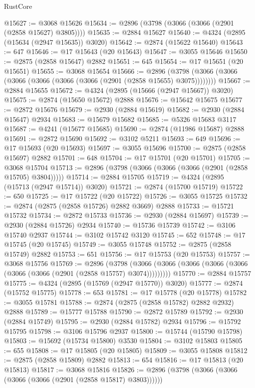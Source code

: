 \begin{lexlean}{RustCore}
\begin{coremodule}
@15627 := @3068 @15626
@15634 := @2896 (@3798 (@3066 (@3066 (@2901 (@2858 @15627) @3805))))
@15635 := @2884 @15627
@15640 := @4324 (@2895 (@15634 (@2947 @15635)) @3020)
@15642 := @2874 (@15622 @15640)
@15643 := 647
@15646 := @17 @15643 (@20 @15643)
@15647 := @3055 @15646
@15650 := @2875 (@2858 @15647) @2882
@15651 := 645
@15654 := @17 @15651 (@20 @15651)
@15655 := @3068 @15654
@15666 := @2896 (@3798 (@3066 (@3066 (@3066 (@3066 (@3066 (@3066 (@2901 (@2858 @15655) @3075))))))))
@15667 := @2884 @15655
@15672 := @4324 (@2895 (@15666 (@2947 @15667)) @3020)
@15675 := @2874 (@15650 @15672) @2888
@15676 := @15642 @15675
@15677 := @2872 @15676
@15679 := @2930 (@2884 @15619)
@15682 := @2930 (@2884 @15647) @2934
@15683 := @15679 @15682
@15685 := @5326 @15683 @3117
@15687 := @4241 (@15677 @15685)
@15690 := @2874 (@11986 @15687) @2888
@15691 := @2872 @15690
@15692 := @3102 @5211
@15693 := 649
@15696 := @17 @15693 (@20 @15693)
@15697 := @3055 @15696
@15700 := @2875 (@2858 @15697) @2882
@15701 := 648
@15704 := @17 @15701 (@20 @15701)
@15705 := @3068 @15704
@15713 := @2896 (@3798 (@3066 (@3066 (@3066 (@2901 (@2858 @15705) @3804)))))
@15714 := @2884 @15705
@15719 := @4324 (@2895 (@15713 (@2947 @15714)) @3020)
@15721 := @2874 (@15700 @15719)
@15722 := 650
@15725 := @17 @15722 (@20 @15722)
@15726 := @3055 @15725
@15732 := @2874 (@2875 (@2858 @15726) @2882 @3669) @2888
@15733 := @15721 @15732
@15734 := @2872 @15733
@15736 := @2930 (@2884 @15697)
@15739 := @2930 (@2884 @15726) @2934
@15740 := @15736 @15739
@15742 := @3106 @15740 @2937
@15744 := @3102 @15742 @3120
@15745 := 652
@15748 := @17 @15745 (@20 @15745)
@15749 := @3055 @15748
@15752 := @2875 (@2858 @15749) @2882
@15753 := 651
@15756 := @17 @15753 (@20 @15753)
@15757 := @3068 @15756
@15769 := @2896
    (@3798 (@3066 (@3066 (@3066 (@3066 (@3066 (@3066 (@3066 (@2901 (@2858 @15757) @3074)))))))))
@15770 := @2884 @15757
@15775 := @4324 (@2895 (@15769 (@2947 @15770)) @3020)
@15777 := @2874 (@15752 @15775)
@15778 := 653
@15781 := @17 @15778 (@20 @15778)
@15782 := @3055 @15781
@15788 := @2874 (@2875 (@2858 @15782) @2882 @2932) @2888
@15789 := @15777 @15788
@15790 := @2872 @15789
@15792 := @2930 (@2884 @15749)
@15795 := @2930 (@2884 @15782) @2934
@15796 := @15792 @15795
@15798 := @3106 @15796 @2937
@15800 := @15744 (@15790 @15798)
@15803 := @15692 (@15734 @15800) @3530
@15804 := @3102 @15803
@15805 := 655
@15808 := @17 @15805 (@20 @15805)
@15809 := @3055 @15808
@15812 := @2875 (@2858 @15809) @2882
@15813 := 654
@15816 := @17 @15813 (@20 @15813)
@15817 := @3068 @15816
@15826 := @2896 (@3798 (@3066 (@3066 (@3066 (@3066 (@2901 (@2858 @15817) @3803))))))

\end{coremodule}
\end{lexlean}
